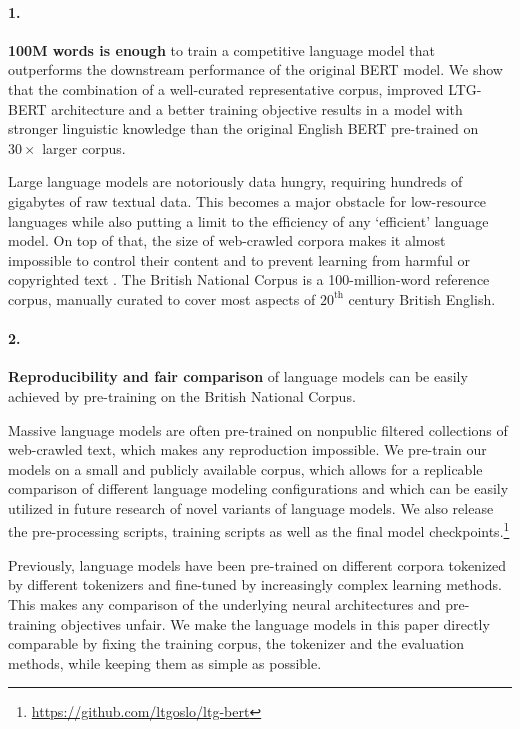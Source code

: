     
    \noindent
    \paragraph{1.}\textbf{100M words is enough} to train a competitive language model that outperforms the downstream performance of the original BERT model. We show that the combination of a well-curated representative corpus, improved LTG-BERT architecture and a better training objective results in a model with stronger linguistic knowledge than the original English BERT pre-trained on $30\times$ larger corpus.
    
     Large language models are notoriously data hungry, requiring hundreds of gigabytes of raw textual data. This becomes a major obstacle for low-resource languages while also putting a limit to the efficiency of any `efficient' language model. On top of that, the size of web-crawled corpora makes it almost impossible to control their content and to prevent learning from harmful or copyrighted text \citep{bender2021dangers}. The British National Corpus \citep[BNC;][]{bnc2007british} is a 100-million-word reference corpus, manually curated to cover most aspects of $20^\textrm{th}$ century British English. %
    
    \noindent
    \paragraph{2.}\textbf{Reproducibility and fair comparison} of language models can be easily achieved by pre-training on the %
    British National Corpus. 
    
    Massive language models are often pre-trained on nonpublic filtered collections of web-crawled text, which makes any reproduction impossible. %
    We pre-train our models on a small and publicly available corpus, 
    which allows for a replicable comparison of different language modeling configurations and which can be easily utilized in future research of novel variants of language models. We also release the pre-processing scripts, training scripts as well as the final model checkpoints.\footnote{\url{https://github.com/ltgoslo/ltg-bert}}
    
    Previously, language models have been pre-trained on different corpora tokenized by different tokenizers and fine-tuned by increasingly complex learning methods. This makes any comparison of the underlying neural architectures and pre-training objectives unfair. We make the language models in this paper directly comparable by fixing the training corpus, the tokenizer and the evaluation methods, while keeping them as simple as possible.
    
